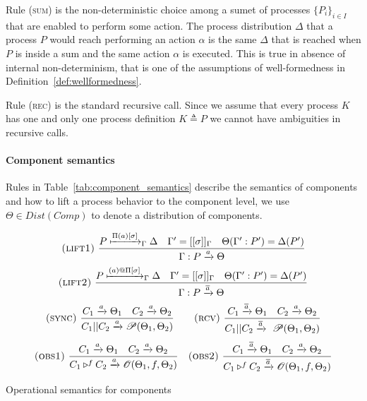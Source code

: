\documentclass{article}
\theoremstyle{remark}
\begin{document}
Rule \textsc{(sum)} is the non-deterministic choice among a sumet of processes $\{P_i\}_{i \in I}$ that are enabled to perform some action. The process distribution $\Delta$ that a process $P$ would reach performing an action $\alpha$ is the same $\Delta$ that is reached when $P$ is inside a sum and the same action $\alpha$ is executed. This is true in absence of internal non-determinism, that is one of the assumptions of well-formedness in Definition~\ref{def:wellformedness}.

Rule \textsc{(rec)} is the standard recursive call. Since we assume that every 
process $K$ has one and only one process definition $K \triangleq P$ we cannot have ambiguities in recursive calls.

\paragraph{Component semantics} %
\label{par:component_semantics}

Rules in Table~\ref{tab:component_semantics} describe the semantics of components and how to lift a process behavior to the component level, we use $\Theta \in Dist(Comp)$ to denote a distribution of components.

\begin{table}[htbp]
	\begin{center}
		$$ \textsc{(lift1)}\ \frac{ P \xmapsto{\Pi(a)[\sigma]}_\Gamma \Delta \quad \Gamma' = [[\sigma]]_\Gamma \quad \Theta(\Gamma' : P') = \Delta(P')}{ \Gamma : P \xrightarrow{a} \Theta }$$
		$$
		\textsc{(lift2)}\ \frac{ P \xmapsto{(a)@\Pi[\sigma]}_\Gamma \Delta \quad \Gamma' = [[\sigma]]_\Gamma \quad \Theta(\Gamma' : P') = \Delta(P') }{ \Gamma : P \xrightarrow{\overline{a}} \Theta } $$
		$$ \textsc{(sync)}\ \frac{ C_1 \xrightarrow{a} \Theta_1 \quad C_2 \xrightarrow{a} \Theta_2}{C_1 || C_2 \xrightarrow{a} \mathscr{P}(\Theta_1, \Theta_2)} \qquad \textsc{(rcv)}\ \frac{ C_1 \xrightarrow{\overline{a}} \Theta_1 \quad C_2 \xrightarrow{a} \Theta_2}{C_1 || C_2 \xrightarrow{\overline{a}} \ \mathscr{P}(\Theta_1, \Theta_2)} $$
		$$ \textsc{(obs1)}\ \frac{ C_1 \xrightarrow{a} \Theta_1 \quad C_2 \xrightarrow{a} \Theta_2 }{ C_1 \triangleright^f C_2 \xrightarrow{a} \mathscr{O}(\Theta_1,f,\Theta_2)} \quad \textsc{(obs2)}\ \frac{ C_1 \xrightarrow{\overline{a}} \Theta_1 \quad C_2 \xrightarrow{a} \Theta_2 }{ C_1 \triangleright^f C_2 \xrightarrow{\overline{a}} \mathscr{O}(\Theta_1,f,\Theta_2)}$$
	\end{center}
	\caption{Operational semantics for components}
	\label{tab:component_semantics}
\end{table}
\end{document}
